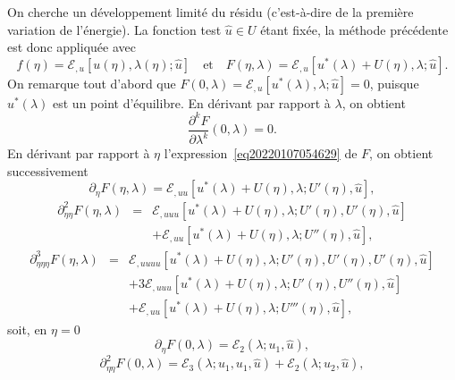 \documentclass{article}
\newcommand{\nosymbol}{}
\begin{document}
On cherche un développement limité du résidu (c'est-à-dire de
la première variation de l'énergie). La fonction test $\hat{u} \in U$
étant fixée, la méthode précédente est donc appliquée
avec
\begin{equation}
  \label{eq20220107054629} f (\eta) =\mathcal{E}_{, u} [u (\eta), \lambda
  (\eta) ; \hat{u}] \quad \text{et} \quad F (\eta, \lambda) =\mathcal{E}_{, u}
  [u^{\ast} (\lambda) + U (\eta), \lambda ; \hat{u}] .
\end{equation}
On remarque tout d'abord que $F (0, \lambda) =\mathcal{E}_{, u} [u^{\ast}
(\lambda), \lambda ; \hat{u}] = 0$, puisque $u^{\ast} (\lambda)$ est un point
d'équilibre. En dérivant par rapport à $\lambda$, on obtient
\begin{equation}
  \label{eq20211112164240} \frac{\partial^k F}{\partial \lambda^k} (0,
  \lambda) = 0.
\end{equation}
En dérivant par rapport à $\eta$ l'expression~\eqref{eq20220107054629}
de $F$, on obtient successivement
\begin{equation}
  \partial_{\eta} F (\eta, \lambda) =\mathcal{E}_{, u  u} [u^{\ast}
  (\lambda) + U (\eta), \lambda ; U' (\eta), \hat{u}],
\end{equation}
\begin{eqnarray}
  \partial_{\eta  \eta}^2 F (\eta, \lambda) & = & \mathcal{E}_{, u
   u  u} [u^{\ast} (\lambda) + U (\eta), \lambda ; U' (\eta),
  U' (\eta), \hat{u}] \nonumber\\
  &  & \nosymbol +\mathcal{E}_{, u  u} [u^{\ast} (\lambda) + U
  (\eta), \lambda ; U'' (\eta), \hat{u}],
\end{eqnarray}
\begin{eqnarray}
  \partial_{\eta  \eta  \eta}^3 F (\eta, \lambda) & = &
  \mathcal{E}_{, u  u  u  u} [u^{\ast} (\lambda) + U
  (\eta), \lambda ; U' (\eta), U' (\eta), U' (\eta), \hat{u}] \nonumber\\
  &  & \nosymbol + 3\mathcal{E}_{, u  u  u} [u^{\ast}
  (\lambda) + U (\eta), \lambda ; U' (\eta), U'' (\eta), \hat{u}] \nonumber\\
  &  & \nosymbol +\mathcal{E}_{, u  u} [u^{\ast} (\lambda) + U
  (\eta), \lambda ; U''' (\eta), \hat{u}],
\end{eqnarray}
soit, en $\eta = 0$
\begin{equation}
  \partial_{\eta} F (0, \lambda) =\mathcal{E}_2 (\lambda ; u_1, \hat{u}),
\end{equation}
\begin{equation}
  \partial_{\eta  \eta}^2 F (0, \lambda) =\mathcal{E}_3 (\lambda ;
  u_1, u_1, \hat{u}) +\mathcal{E}_2 (\lambda ; u_2, \hat{u}),
\end{equation}
\end{document}
